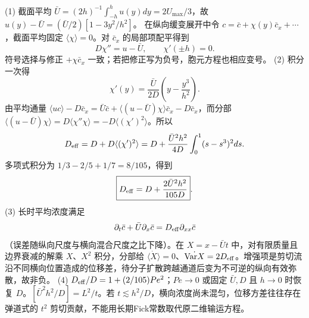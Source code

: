 (1) 截面平均 \(\bar U=(2h)^{-1}\int_{-h}^h u(y)dy=2U_{\max}/3\)，故
\(u(y)-\bar U=(\bar U/2)[1-3y^2/h^2]\)。
在纵向缓变展开中令 \(c=\bar c+\chi(y)\bar c_x+\cdots\)，截面平均固定 \(\langle\chi\rangle=0\)。对 \(\bar c_x\) 的局部项配平得到
\[
D\chi''=u-\bar U,\qquad \chi'(\pm h)=0.
\]
符号选择与修正 \(+\chi\bar c_x\) 一致；若把修正写为负号，胞元方程也相应变号。
(2) 积分一次得
\[
\chi'(y)=\frac{\bar U}{2D}\left(y-\frac{y^3}{h^2}\right).
\]
由平均通量 \(\langle uc\rangle-D\bar c_x=\bar U\bar c+\langle(u-\bar U)\chi\rangle\bar c_x-D\bar c_x\)，而分部 \(\langle(u-\bar U)\chi\rangle=D\langle\chi''\chi\rangle=-D\langle(\chi')^2\rangle\)。所以
\[
D_{\rm eff}=D+D\langle(\chi')^2\rangle
=D+\frac{\bar U^2h^2}{4D}\int_0^1(s-s^3)^2ds.
\]
多项式积分为 \(1/3-2/5+1/7=8/105\)，得到
\[
\boxed{D_{\rm eff}=D+\frac{2\bar U^2h^2}{105D}}.
\]
(3) 长时平均浓度满足
\[
\partial_t\bar c+\bar U\partial_x\bar c=D_{\rm eff}\partial_{xx}\bar c
\]
（误差随纵向尺度与横向混合尺度之比下降）。在 \(X=x-\bar Ut\) 中，对有限质量且边界衰减的解乘 \(X\)、\(X^2\) 积分，分部给 \(\dot{\langle X\rangle}=0\)、\(\dot{\mathrm{Var}X}=2D_{\rm eff}\)。增强项是剪切流沿不同横向位置造成的位移差，待分子扩散跨越通道后变为不可逆的纵向有效弥散，故非负。
(4) \(D_{\rm eff}/D=1+(2/105)Pe^2\)；\(Pe\to0\) 或固定 \(\bar U,D\) 且 \(h\to0\) 时恢复 \(D\)。\([\bar U^2h^2/D]=L^2/t\)。若 \(t\lesssim h^2/D\)，横向浓度尚未混匀，位移方差往往存在弹道式的 \(t^2\) 剪切贡献，不能用长期Fick常数取代原二维输运方程。
